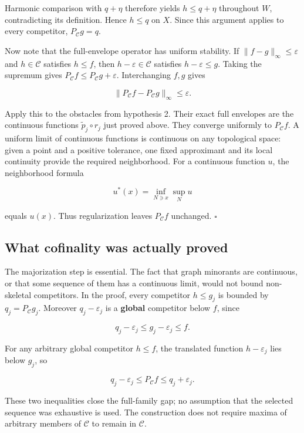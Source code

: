 \documentclass[
  11pt,
]{article}
\begin{document}
Harmonic comparison with \(q+\eta\) therefore yields \(h\leq q+\eta\)
throughout \(W\), contradicting its definition. Hence \(h\leq q\) on
\(X\). Since this argument applies to every competitor,
\(P_{\mathcal C}g=q\).

Now note that the full-envelope operator has uniform stability. If
\(\|f-g\|_\infty\leq\varepsilon\) and \(h\in\mathcal C\) satisfies
\(h\leq f\), then \(h-\varepsilon\in\mathcal C\) satisfies
\(h-\varepsilon\leq g\). Taking the supremum gives
\(P_{\mathcal C}f\leq P_{\mathcal C}g+\varepsilon\). Interchanging
\(f,g\) gives

\[\|P_{\mathcal C}f-P_{\mathcal C}g\|_\infty\leq\varepsilon.\]

Apply this to the obstacles from hypothesis 2. Their exact full
envelopes are the continuous functions \(\widetilde p_j\circ r_j\) just
proved above. They converge uniformly to \(P_{\mathcal C}f\). A uniform
limit of continuous functions is continuous on any topological space:
given a point and a positive tolerance, one fixed approximant and its
local continuity provide the required neighborhood. For a continuous
function \(u\), the neighborhood formula

\[u^*(x)=\inf_{N\ni x}\sup_Nu\]

equals \(u(x)\). Thus regularization leaves \(P_{\mathcal C}f\)
unchanged. \(\square\)

\subsection{What cofinality was actually
proved}\label{what-cofinality-was-actually-proved}

The majorization step is essential. The fact that graph minorants are
continuous, or that some sequence of them has a continuous limit, would
not bound non-skeletal competitors. In the proof, every competitor
\(h\leq g_j\) is bounded by \(q_j=P_{\mathcal C}g_j\). Moreover
\(q_j-\varepsilon_j\) is a \textbf{global} competitor below \(f\), since

\[q_j-\varepsilon_j\leq g_j-\varepsilon_j\leq f.\]

For any arbitrary global competitor \(h\leq f\), the translated function
\(h-\varepsilon_j\) lies below \(g_j\), so

\[q_j-\varepsilon_j\leq P_{\mathcal C}f\leq q_j+\varepsilon_j.\]

These two inequalities close the full-family gap; no assumption that the
selected sequence was exhaustive is used. The construction does not
require maxima of arbitrary members of \(\mathcal C\) to remain in
\(\mathcal C\).
\end{document}
